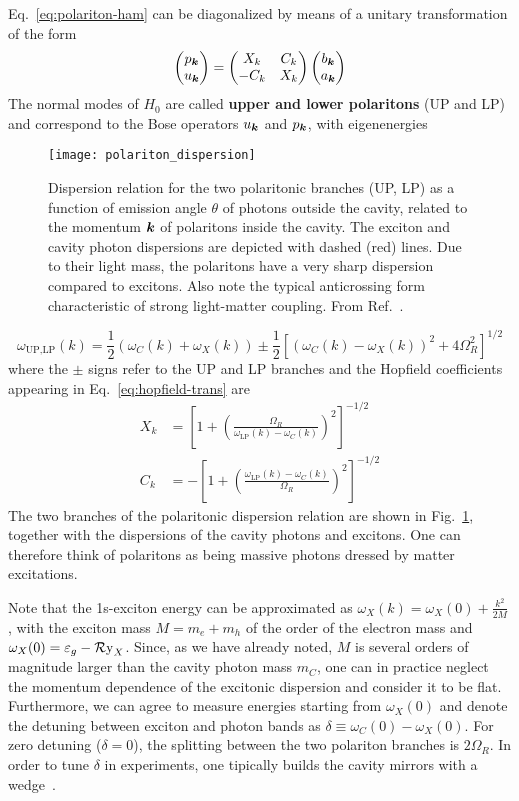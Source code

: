 Eq.~\eqref{eq:polariton-ham} can be diagonalized by means of a unitary
transformation of the form~\cite{Hopfield1958}
%
\begin{equation}\label{eq:hopfield-trans}
  \begin{pmatrix} p_{\bm{k}}\\ u_{\bm{k}} \end{pmatrix} = \begin{pmatrix} X_k & C_k\\ -C_k & X_k \end{pmatrix} \begin{pmatrix} b_{\bm{k}}\\ a_{\bm{k}} \end{pmatrix}
\end{equation}
% 
The normal modes of $H_0$ are called \textbf{upper and lower
  polaritons} (UP and LP) and correspond to the Bose operators
$u_{\bm{k}}$ and $p_{\bm{k}}$, with eigenenergies
%
\begin{figure}[tb]\centering
  \texttt{[image: polariton\_dispersion]}
  \caption{
    Dispersion relation for the two polaritonic branches (UP, LP) as a function of emission angle $\theta$ of photons outside the cavity, related to the momentum $\bm{k}$ of polaritons inside the cavity. The exciton and cavity photon dispersions are depicted with dashed (red) lines. Due to their light mass, the polaritons have a very sharp dispersion  compared to excitons. Also note the typical anticrossing form characteristic of strong light-matter coupling.
From Ref.~\cite{Keeling_2007}.
}\label{fig:polariton-dispersion}
\end{figure}
% 
\begin{equation}\label{eq:polariton-dispersion}
  \omega_{\text{UP,LP}}(k) = \frac{1}{2}\left(\omega_C(k) + \omega_X(k)\right) \pm \frac{1}{2}\left[\left(\omega_C(k) - \omega_X(k)\right)^2 + 4 \Omega_R^2\right]^{1/2}
\end{equation}
% 
where the $\pm$ signs refer to the UP and LP branches and the Hopfield
coefficients appearing in Eq.~\eqref{eq:hopfield-trans} are
\begin{align}
  X_k & =\left[1 + \left(\frac{\Omega_R}{\omega_{\text{LP}}(k) - \omega_C(k)}\right)^2\right]^{-1/2}\label{eq:hopfield-X}\\
  C_k & =-\left[1 + \left(\frac{\omega_{\text{LP}}(k) - \omega_C(k)}{\Omega_R}\right)^2\right]^{-1/2}
\end{align}
The two branches of the polaritonic dispersion relation are shown in
Fig.~\ref{fig:polariton-dispersion}, together with the dispersions of
the cavity photons and excitons. One can therefore think of polaritons
as being massive photons dressed by matter excitations.

Note that the 1s-exciton energy can be approximated as
$\omega_X(k) = \omega_X(0) + \frac{k^2}{2M}$, with the exciton mass
$M = m_e + m_h$ of the order of the electron mass and
$\omega_X(0) = \varepsilon_g - \operatorname{\mathcal{R}y}_X$. Since, as we have already
noted, $M$ is several orders of magnitude larger than the cavity
photon mass $m_{C}$, one can in practice neglect the momentum
dependence of the excitonic dispersion and consider it to be
flat. Furthermore, we can agree to measure energies starting from
$\omega_X(0)$ and denote the detuning between exciton and photon bands
as $\delta \equiv \omega_C(0) - \omega_X(0)$. For zero detuning
($\delta = 0$), the splitting between the two polariton branches is
$2\Omega_R$. In order to tune $\delta$ in experiments, one tipically
builds the cavity mirrors with a wedge~\cite{Weisbuch1992}.



